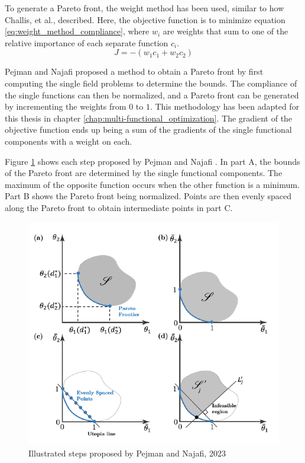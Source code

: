 To generate a Pareto front, the weight method has been used, similar to how Challis, et al., \cite{Challis_Roberts_Wilkins_2008} described. Here, the objective function is to minimize equation \ref{eq:weight_method_compliance}, where $w_i$ are weights that sum to one of the relative importance of each separate function $c_i$.
\begin{equation}
    J = - \left(w_1c_1 + w_2c_2\right)
    \label{eq:weight_method_compliance}
\end{equation}

Pejman and Najafi \cite{Pejman_Najafi_2023} proposed a method to obtain a Pareto front by first computing the single field problems to determine the bounds. The compliance of the single functions can then be normalized, and a Pareto front can be generated by incrementing the weights from $0$ to $1$. This methodology has been adapted for this thesis in chapter \ref{chap:multi-functional_optimization}. The gradient of the objective function ends up being a sum of the gradients of the single functional components with a weight on each.

Figure \ref{fig:pejman_najafi} shows each step proposed by Pejman and Najafi \cite{Pejman_Najafi_2023}. In part A, the bounds of the Pareto front are determined by the single functional components. The maximum of the opposite function occurs when the other function is a minimum. Part B shows the Pareto front being normalized. Points are then evenly spaced along the Pareto front to obtain intermediate points in part C. 
\begin{figure}[ht]
    \centering
    \includegraphics[width=0.6\linewidth]{figures/chapter_3/MultifunctionalSubsteps.png}
    \caption{Illustrated steps proposed by Pejman and Najafi, 2023 \cite{Pejman_Najafi_2023}}
    \label{fig:pejman_najafi}
\end{figure}


